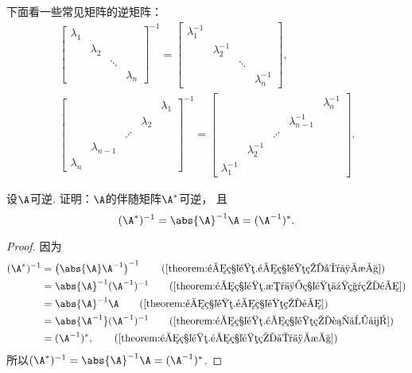 \begin{example}
下面看一些常见矩阵的逆矩阵：\begin{gather*}
	\begin{bmatrix}
		\lambda_1 \\
		& \lambda_2 \\
		&& \ddots \\
		&&& \lambda_n
	\end{bmatrix}^{-1}
	= \begin{bmatrix}
		\lambda_1^{-1} \\
		& \lambda_2^{-1} \\
		&& \ddots \\
		&&& \lambda_n^{-1}
	\end{bmatrix}, \\
	\begin{bmatrix}
		& & & & \lambda_1 \\
		& & & \lambda_2 \\
		& & \iddots \\
		& \lambda_{n-1} \\
		\lambda_n
	\end{bmatrix}^{-1}
	= \begin{bmatrix}
		& & & & \lambda_n^{-1} \\
		& & & \lambda_{n-1}^{-1} \\
		& & \iddots \\
		& \lambda_2^{-1} \\
		\lambda_1^{-1}
	\end{bmatrix}.
\end{gather*}
\end{example}

\begin{example}\label{theorem:逆矩阵.伴随矩阵的逆与逆矩阵的伴随}
设\(\A\)可逆.
证明：\(\A\)的伴随矩阵\(\A^*\)可逆，
且\begin{equation}
	(\A^*)^{-1}
	= \abs{\A}^{-1} \A
	= (\A^{-1})^*.
\end{equation}
\begin{proof}
因为\begin{align*}
	(\A^*)^{-1}
	&= \left( \abs{\A} \A^{-1} \right)^{-1}
		\tag{\cref{theorem:逆矩阵.逆矩阵的唯一性}} \\
	&= \abs{\A}^{-1} (\A^{-1})^{-1}
		\tag{\cref{theorem:逆矩阵.数与矩阵乘积的逆}} \\
	&= \abs{\A}^{-1} \A
		\tag{\cref{theorem:逆矩阵.逆矩阵的逆}} \\
	&= \abs{\A^{-1}} (\A^{-1})^{-1}
		\tag{\cref{theorem:逆矩阵.逆矩阵的行列式}} \\
	&= (\A^{-1})^*,
		\tag{\cref{theorem:逆矩阵.逆矩阵的唯一性}}
\end{align*}
所以\((\A^*)^{-1}
= \abs{\A}^{-1} \A
= (\A^{-1})^*\).
\end{proof}
\end{example}

